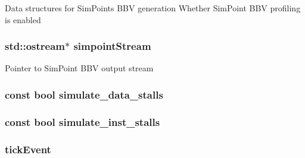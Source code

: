 \label{classAtomicSimpleCPU_a556c6eb1f8f869ee7d0802381701c49f}
Data structures for SimPoints BBV generation Whether SimPoint BBV profiling is enabled \hypertarget{classAtomicSimpleCPU_a77497fabc62f774e824e9b57974e0301}{
\subsubsection[{simpointStream}]{\setlength{\rightskip}{0pt plus 5cm}std::ostream$\ast$ {\bf simpointStream}}}
\label{classAtomicSimpleCPU_a77497fabc62f774e824e9b57974e0301}
Pointer to SimPoint BBV output stream \hypertarget{classAtomicSimpleCPU_aab46afe7eb154b233d2ba1886a4b399f}{
\subsubsection[{simulate\_\-data\_\-stalls}]{\setlength{\rightskip}{0pt plus 5cm}const bool {\bf simulate\_\-data\_\-stalls}}}
\label{classAtomicSimpleCPU_aab46afe7eb154b233d2ba1886a4b399f}
\hypertarget{classAtomicSimpleCPU_ac5ff523d495df7133594dec7894aacc7}{
\subsubsection[{simulate\_\-inst\_\-stalls}]{\setlength{\rightskip}{0pt plus 5cm}const bool {\bf simulate\_\-inst\_\-stalls}}}
\label{classAtomicSimpleCPU_ac5ff523d495df7133594dec7894aacc7}
\hypertarget{classAtomicSimpleCPU_aa36b8e894416f0ec98f701ab08f2ac22}{
\subsubsection[{tickEvent}]{ {\bf tickEvent}}}
